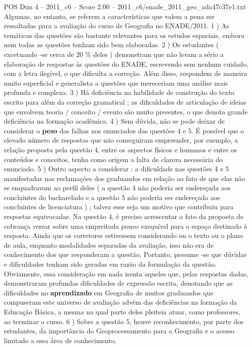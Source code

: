 \begin{textsample}{POS Dim 4 – 2011\_c6 – Score 2.00 – 2011\_c6/enade\_2011\_geo\_ada47c37e1.txt}
Algumas, no entanto, se referem a características que valem a pena ser ressaltadas para a avaliação do curso de Geografia no ENADE/2011. 1 ) As temáticas das questões são bastante relevantes para os estudos espaciais, embora nem todas as questões tenham sido bem elaboradas. 2 ) Os estudantes ( excetuando -se cerca de 20 \% deles ) demonstram que não levam a sério a elaboração de respostas às questões do ENADE, escrevendo sem nenhum cuidado, com a letra ilegível, o que dificulta a correção.
Além disso, respondem de maneira muito superficial e generalista a questões que mereceriam uma análise mais profunda e complexa. 3 ) Há deficiência na habilidade de construção do texto escrito para além da correção gramatical ; as dificuldades de articulação de ideias que envolvem teoria / conceito / evento são muito presentes, o que denota grande deficiência na formação acadêmica. 4 ) Sem dúvida, não se pode deixar de considerar o \textbf{peso} das falhas nos enunciados das questões 4 e 5.
É possível que o elevado número de respostas que não conseguiram empreender, por exemplo, a relação proposta pela questão 4, entre os aspectos físicos e humanos e entre os conteúdos e conceitos, tenha como origem a falta de clareza necessária do enunciado. 5 ) Outro aspecto a considerar : a dificuldade nas questões 4 e 5 manifestadas nas reclamações dos graduandos em relação ao fato de que elas não se enquadravam ao perfil deles ( a questão 4 não poderia ser endereçada aos concluintes do bacharelado e a questão 5 não poderia ser endereçada aos concluintes de licenciatura ) ; talvez esse seja um motivo que contribuiu para respostas equivocadas.
Na questão 4, é preciso acrescentar o fato da proposta de cobrança versar sobre uma empreitada pouco exequível para o espaço destinado à resposta.
Ainda que os corretores estivessem considerando ou o texto ou o plano de aula, enquanto modalidades separadas da avaliação, isso não era de conhecimento dos que responderam a questão.
Portanto, presume -se que dúvidas e dificuldades tenham sido geradas em razão da formulação da questão.
Obviamente, essa consideração em nada isenta aqueles que, pelas respostas dadas, demonstraram profundas dificuldades de expressão escrita, denotando que as dificuldades no \textbf{aprendizado} em Geografia de muitos graduandos que compuseram este universo de avaliação advêm das deficiências na formação da Educação Básica, a mesma na qual parte deles pleiteia atuar, como professores, ao terminar o curso. 6 ) Sobre a questão 5, houve reconhecimento, por parte dos estudantes, da importância do Geoprocessamento para a Geografia e o acesso limitado a essa área de conhecimento.

\end{textsample}
